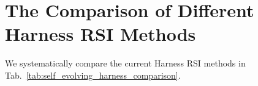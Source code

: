 \documentclass{article} %
\begin{document}





\clearpage

\appendix

\section{The Comparison of Different Harness RSI Methods}

We systematically compare the current Harness RSI methods in Tab.~\ref{tab:self_evolving_harness_comparison}.

\newcommand{\cmark}{\textcolor{green!60!black}{\ding{51}}}
\newcommand{\xmark}{\textcolor{red!70!black}{\ding{55}}}
\end{document}
